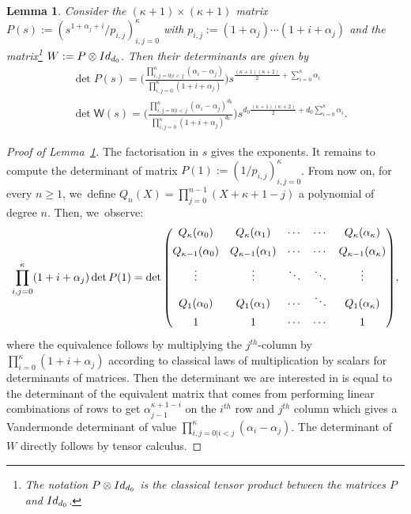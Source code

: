 \documentclass[10pt,a4paper]{amsart}
\newtheorem{lemma}[theorem]{Lemma}
\theoremstyle{definition}
\newcommand{\sW}{{\mathsf W}}
\newcommand{\I}{\textup{Id}}\let\Id\I
\begin{document}
\begin{lemma}
\label{lem:wronskian}
Consider the $(\kappa+1)\times(\kappa+1)$ matrix
$P(s):= (s^{1+\alpha_j+i}/p_{i,j})_{i,j=0} ^\kappa$ with
$p_{i,j}:=(1+\alpha_j) \cdots (1+i+\alpha_j)$ and the matrix\footnote{The notation $P\otimes \I_{d_0}$ is the classical tensor product between the matrices $P$
and $\I_{d_0}$.} $W:=P\otimes \I_{d_0}$. Then their
determinants are given by
\begin{equation}
\label{eq:det-k}
\begin{aligned}
&\det P(s)=
\biggl(\frac{ \prod_{i, j=0 | i<j}^\kappa
(\alpha_i - \alpha_j)}{\prod_{i,j=0} ^\kappa(1+i+\alpha_j)}
\biggr) s^{ \frac{(\kappa+1)(\kappa+2)}{2}+\sum_{i=0}^\kappa \alpha_i}\\
&\det \sW(s) = \biggl(\frac{ \prod_{i, j=0 | i<j}^\kappa
(\alpha_i - \alpha_j)^{d_0}}{\prod_{i,j=0} ^\kappa(1+i+\alpha_j)^{d_0}}
\biggr) s^{d_0 \frac{(\kappa+1)(\kappa+2)}{2}+d_0\sum_{i=0}^\kappa \alpha_i}.
\end{aligned}
\end{equation}
\end{lemma}
\begin{proof}[Proof of Lemma~\ref{lem:wronskian}]
The factorisation in $s$ gives the exponents. It remains to compute the determinant of matrix ${P}(1):= (1/p_{i,j})_{i,j=0} ^\kappa$. From now on,
for every $n\geq1$, we~define $Q_n(X)=\prod_{j=0}^{n-1} (X+\kappa+1-j)$ a polynomial of degree $n$. Then, we~observe:
\[\arraycolsep5pt
\prod_{i,j=0} ^\kappa (1+i+\alpha_j) \det {P}(1)=
\det
\begin{pmatrix}
Q_{\kappa}(\alpha_0) & Q_{\kappa}(\alpha_1) &\cdots& \cdots & Q_{\kappa}(\alpha_{\kappa}) \\[5pt]
Q_{\kappa-1}(\alpha_0) & Q_{\kappa-1}(\alpha_1) &\cdots& \cdots & Q_{\kappa-1}(\alpha_{\kappa}) \\[5pt]
\vdots & \vdots& \ddots & \ddots & \vdots \\[5pt]
Q_{1}(\alpha_0) & Q_{1}(\alpha_1) &\cdots& \ddots & Q_{1}(\alpha_{\kappa}) \\[5pt]
1 & 1 &\cdots& \cdots & 1
\end{pmatrix}\!,
\]
where the equivalence follows by multiplying the $j^{th}$-column by $\prod_{i=0}^\kappa (1+i+\alpha_j)$ according to classical laws of multiplication by scalars for determinants of matrices. Then the determinant we are interested in is equal to the determinant of the equivalent matrix that comes from performing linear combinations of rows to get $\alpha_{j-1}^{\kappa+1-i}$ on the $i^{th}$ row and $j^{th}$ column which gives a Vandermonde determinant of value $\prod_{i, j=0 | i<j}^\kappa (\alpha_i - \alpha_j)$. The determinant of $W$ directly follows by tensor calculus.
\end{proof}
\end{document}

